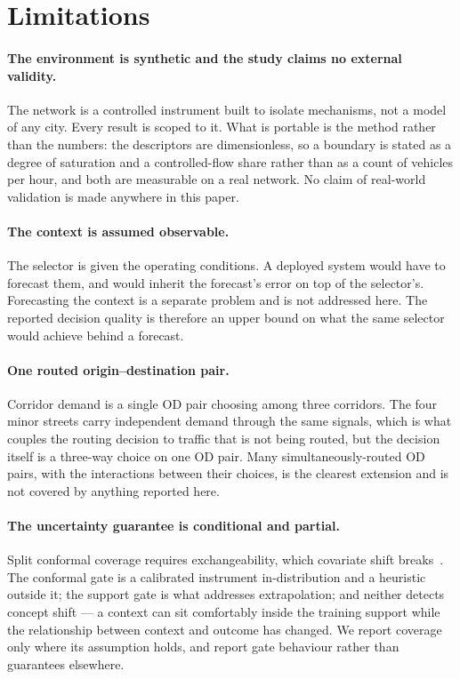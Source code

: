 \section{Limitations}

\paragraph{The environment is synthetic and the study claims no external
validity.} The network is a controlled instrument built to isolate mechanisms,
not a model of any city. Every result is scoped to it. What is portable is the
method rather than the numbers: the descriptors are dimensionless, so a boundary
is stated as a degree of saturation and a controlled-flow share rather than as a
count of vehicles per hour, and both are measurable on a real network. No claim
of real-world validation is made anywhere in this paper.

\paragraph{The context is assumed observable.} The selector is given the
operating conditions. A deployed system would have to forecast them, and would
inherit the forecast's error on top of the selector's. Forecasting the context
is a separate problem and is not addressed here. The reported decision quality
is therefore an upper bound on what the same selector would achieve behind a
forecast.

\paragraph{One routed origin--destination pair.} Corridor demand is a single OD
pair choosing among three corridors. The four minor streets carry independent
demand through the same signals, which is what couples the routing decision to
traffic that is not being routed, but the decision itself is a three-way choice
on one OD pair. Many simultaneously-routed OD pairs, with the interactions
between their choices, is the clearest extension and is not covered by anything
reported here.

\paragraph{The uncertainty guarantee is conditional and partial.} Split
conformal coverage requires exchangeability, which covariate shift
breaks~\cite{shimodaira2000,tibshirani2019covshift}. The conformal gate is a
calibrated instrument in-distribution and a heuristic outside it; the support
gate is what addresses extrapolation; and neither detects concept shift --- a
context can sit comfortably inside the training support while the relationship
between context and outcome has changed. We report coverage only where its
assumption holds, and report gate behaviour rather than guarantees elsewhere.

